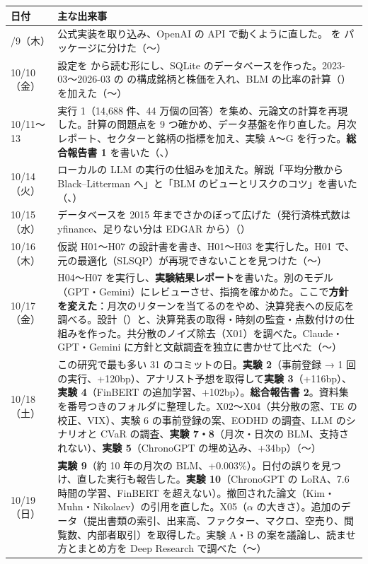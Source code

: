 \begin{longtable}{P{2.0cm}P{12.6cm}}
\toprule
\textbf{日付} & \textbf{主な出来事} \\
\midrule
\endhead
\bottomrule
{}/9（木） & 公式実装を取り込み、OpenAI の API で動くように直した。 を  パッケージに分けた（〜） \\
10/10（金） & 設定を  から読む形にし、SQLite のデータベースを作った。2023-03〜2026-03 の \SP{} の構成銘柄と株価を入れ、BLM の比率の計算（）を加えた（〜） \\
10/11〜13 & 実行 1（14,688 件、44 万個の回答）を集め、元論文の計算を再現した。計算の問題点を 9 つ確かめ、データ基盤を作り直した。月次レポート、セクターと銘柄の指標を加え、実験 A〜G を行った。\textbf{総合報告書 1} を書いた（、） \\
10/14（火） & ローカルの LLM の実行の仕組みを加えた。解説「平均分散から Black--Litterman へ」と「BLM のビューとリスクのコツ」を書いた（、） \\
10/15（水） & データベースを 2015 年までさかのぼって広げた（発行済株式数は yfinance、足りない分は EDGAR から）（） \\
10/16（木） & 仮説 H01〜H07 の設計書を書き、H01〜H03 を実行した。H01 で、元の最適化（SLSQP）が再現できないことを見つけた（〜） \\
10/17（金） & H04〜H07 を実行し、\textbf{実験結果レポート}を書いた。別のモデル（GPT・Gemini）にレビューさせ、指摘を確かめた。ここで\textbf{方針を変えた}：月次のリターンを当てるのをやめ、決算発表への反応を調べる。設計（）と、決算発表の取得・時刻の監査・点数付けの仕組みを作った。共分散のノイズ除去（X01）を調べた。Claude・GPT・Gemini に方針と文献調査を独立に書かせて比べた（〜） \\
10/18（土） & この研究で最も多い 31 のコミットの日。\textbf{実験 2}（事前登録 → 1 回の実行、+120bp）、アナリスト予想を取得して\textbf{実験 3}（+116bp）、\textbf{実験 4}（FinBERT の追加学習、+102bp）。\textbf{総合報告書 2}。資料集を番号つきのフォルダに整理した。X02〜X04（共分散の窓、TE の校正、VIX）、実験 6 の事前登録の案、EODHD の調査、LLM のシナリオと CVaR の調査、\textbf{実験 7・8}（月次・日次の BLM、支持されない）、\textbf{実験 5}（ChronoGPT の埋め込み、+34bp）（〜） \\
10/19（日） & \textbf{実験 9}（約 10 年の月次の BLM、+0.003\%）。日付の誤りを見つけ、直した実行も報告した。\textbf{実験 10}（ChronoGPT の LoRA、7.6 時間の学習、FinBERT を超えない）。撤回された論文（Kim・Muhn・Nikolaev）の引用を直した。X05（$\alpha$ の大きさ）。追加のデータ（提出書類の索引、出来高、ファクター、マクロ、空売り、閲覧数、内部者取引）を取得した。実験 A・B の案を議論し、読ませ方とまとめ方を Deep Research で調べた（〜） \\

\end{longtable}
